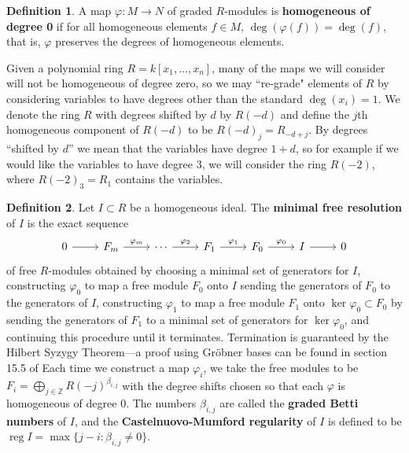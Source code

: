 \documentclass[11pt]{article}
\newcommand{\Z}{\mathbb{Z}}
\DeclareMathOperator{\reg}{reg}
\theoremstyle{definition}
\newtheorem{definition}{Definition}
\begin{document}
\begin{definition}
	A map $\varphi: M \to N$ of graded $R$-modules is \textbf{homogeneous of degree 0} if for all homogeneous elements $f \in M$, $\deg(\varphi(f)) = \deg(f)$, that is, $\varphi$ preserves the degrees of homogeneous elements. 
\end{definition}


Given a polynomial ring $R = k[x_1, \dots, x_n]$, many of the maps we will consider will not be homogeneous of degree zero, so we may ``re-grade" elements of $R$ by considering variables to have degrees other than the standard $\deg(x_i) = 1$. We denote the ring $R$ with degrees shifted by $d$ by $R(-d)$ and define the $j$th homogeneous component of $R(-d)$ to be $R(-d)_j = R_{-d + j}$. By degrees ``shifted by $d$'' we mean that the variables have degree $1 + d$, so for example if we would like the variables to have degree $3$, we will consider the ring $R(-2)$, where $R(-2)_3 = R_1$ contains the variables. 


\begin{definition}
	Let $I \subset R$ be a homogeneous ideal. The \textbf{minimal free resolution} of $I$ is the exact sequence  \[ \begin{tikzcd}
		0 \arrow[r] & F_m \arrow[r, "\varphi_m"] & \cdots \arrow[r, "\varphi_2"] & F_1 \arrow[r, "\varphi_1"] & F_0 \arrow[r, "\varphi_0"] & I \arrow[r] & 0
	\end{tikzcd} \] of free $R$-modules obtained by choosing a minimal set of generators for $I$, constructing $\varphi_0$ to map a free module $F_0$ onto $I$ sending the generators of $F_0$ to the generators of $I$, constructing $\varphi_1$ to map a free module $F_1$ onto $\ker \varphi_0 \subset F_0$ by sending the generators of $F_1$ to a minimal set of generators for $\ker \varphi_0$, and continuing this procedure until it terminates. Termination is guaranteed by the Hilbert Syzygy Theorem---a proof using Gröbner bases can be found in section 15.5 of \cite{eisenbud1995commutative} Each time we construct a map $\varphi_i$, we take the free modules to be $F_i = \bigoplus_{j \in \Z} R(-j)^{\beta_{i,j}}$ with the degree shifts chosen so that each $\varphi$ is homogeneous of degree 0. The numbers $\beta_{i,j}$ are called the \textbf{graded Betti numbers} of $I$, and the \textbf{Castelnuovo-Mumford regularity} of $I$ is defined to be $\reg I = \max\{j - i : \beta_{i,j} \neq 0\}$. 
\end{definition}
\end{document}
